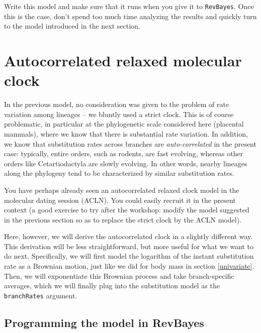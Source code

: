 \documentclass[usletter]{article}
\newcommand{\cmd}[1]{\texttt{#1}}
\begin{document}
Write this model and make sure that it runs when you give it to \cmd{RevBayes}. Once this is the case, don't spend too much time analyzing the results and quickly turn to the model introduced in the next section.

\section{Autocorrelated relaxed molecular clock}

In the previous model, no consideration was given to the problem of rate variation among lineages --
we bluntly used a strict clock. This is of course problematic, in particular at the phylogenetic scale considered here (placental mammals), where we know that there is substantial rate variation. In addition, we know that substitution rates across branches are \emph{auto-correlated} in the present case: typically, entire orders, such as rodents, are fast evolving, whereas other orders like Cetartiodactyla are slowly evolving. In other words, nearby lineages along the phylogeny tend to be characterized by similar substitution rates.

You have perhaps already seen an autocorrelated relaxed clock model in the molecular dating session (ACLN). You could easily recruit it in the present context (a good exercise to try after the workshop: modify the model suggested in the previous section so as to replace the strict clock by the ACLN model).

Here, however, we will derive the autocorrelated clock in a slightly different way. This derivation will be less straightforward, but more useful for what we want to do next.
Specifically, we will first model the logarithm of the instant substitution rate as a Brownian motion, just like we did for body mass in section \ref{univariate}. Then, we will exponentiate this Brownian process and take branch-specific averages, which we will finally plug into the substitution model as the \cmd{branchRates} argument.

\subsection*{Programming the model in RevBayes}
\end{document}
